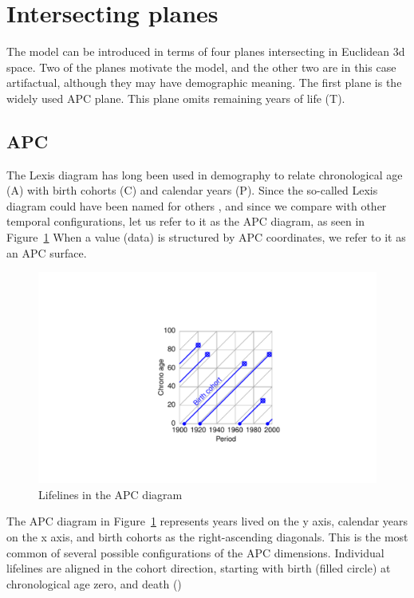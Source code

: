 \documentclass[11pt,oneside]{article} %
\begin{document}
\section*{Intersecting planes}

The  model can be introduced in terms of four planes intersecting in
Euclidean 3d space. Two of the planes motivate the model, and the other two
are in this case artifactual, although they may have demographic meaning. The
first plane is the widely used APC plane. This plane omits remaining years of
life (T). 

\subsection*{APC}
The Lexis diagram has long been used in demography to relate chronological age
(A) with birth cohorts (C) and calendar years (P). Since the so-called Lexis
diagram could have been named for others
\citep{vandeschrick2001lexis,keiding2011age}, and since we compare with other
temporal configurations, let us refer to it as the APC diagram, as seen in
Figure~\ref{APCright}
When a value (data) is structured by APC coordinates, we refer to it as an APC surface.

\begin{figure}[b!]
    \centering
    \includegraphics[scale=.7]{Figures/LabPres/APC2.pdf}
    \caption{Lifelines in the APC diagram}
    \label{APCright}
\end{figure} 

The APC diagram in Figure~\ref{APCright} represents years lived on the y axis,
calendar years on the x axis, and birth cohorts as the right-ascending
diagonals. This is the most common of several possible configurations
of the APC dimensions. Individual lifelines are aligned in the cohort direction,
starting with birth (filled circle) at chronological age zero, and death ()
\end{document}
